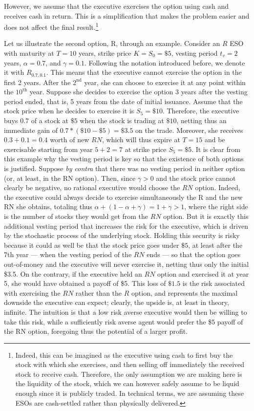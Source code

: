 However, we assume that the executive exercises the option using cash and receives cash in return. This is a simplification that makes the problem easier and does not affect the final result.\footnote{Indeed, this can be imagined as the executive using cash to first buy the stock with which she exercises, and then selling off immediately the received stock to receive cash. Therefore, the only assumption we are making here is the liquidity of the stock, which we can however safely assume to be liquid enough since it is publicly traded. In technical terms, we are assuming these ESOs are cash-settled rather than physically delivered.}

Let us illustrate the second option, R, through an example. Consider an $R$ ESO with maturity at $T=10$ years, strike price $K=S_0=\$5$, vesting period $t_v=2$ years, $\alpha = 0.7$, and $\gamma=0.1$. Following the notation introduced before, we denote it with $R_{0.7, 0.1}$. This means that the executive cannot exercise the option in the first 2 years. After the $2^{\text{nd}}$ year, she can choose to exercise it at any point within the $10^{\text{th}}$ year. Suppose she decides to exercise the option 3 years after the vesting period ended, that is, 5 years from the date of initial issuance. Assume that the stock price when he decides to exercise it is $S_5 = \$10$. Therefore, the executive buys $0.7$ of a stock at $\$5$ when the stock is trading at $\$10$, netting thus an immediate gain of $0.7*(\$10-\$5)=\$3.5$ on the trade. Moreover, she receives $0.3+0.1=0.4$ worth of new $RN$, which will thus expire at $T=15$ and be exercisable starting from year $5+2=7$ at strike price $S_5=\$5$. 
It is clear from this example why the vesting period is key so that the existence of both options is justified. Suppose \textit{by contra} that there was no vesting period in neither option (or, at least, in the RN option). Then, since $\gamma > 0$ and the stock price cannot clearly be negative, no rational executive would choose the $RN$ option. Indeed, the executive could always decide to exercise simultaneously the R and the new RN she obtains, totaling thus $\alpha + (1-\alpha+\gamma)=1+\gamma > 1$, where the right side is the number of stocks they would get from the $RN$ option. But it is exactly this additional vesting period that increases the risk for the executive, which is driven by the stochastic process of the underlying stock. Holding this security is risky because it could as well be that the stock price goes under $\$5$, at least after the 7th year --- when the vesting period of the $RN$ ends --- so that the option goes out-of-money and the executive will never exercise it, netting thus only the initial \$3.5. On the contrary, if the executive held an $RN$ option and exercised it at year 5, she would have obtained a payoff of \$5. This loss of $\$1.5$ is the risk associated with exercising the $RN$ rather than the $R$ option, and represents the maximal downside the executive can expect; clearly, the upside is, at least in theory, infinite. The intuition is that a low risk averse executive would then be willing to take this risk, while a sufficiently risk averse agent would prefer the \$5 payoff of the RN option, foregoing thus the potential of a larger profit. 
